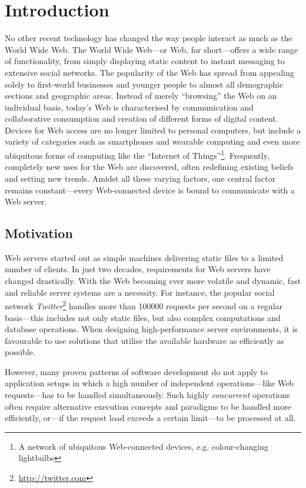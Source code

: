 \chapter{Introduction}
No other recent technology has changed the way people interact as much as the World Wide Web. The World Wide Web---or Web, for short---offers a wide range of functionality, from simply displaying static content to instant messaging to extensive social networks. The popularity of the Web has spread from appealing solely to first-world businesses and younger people to almost all demographic sections and geographic areas. Instead of merely ``browsing'' the Web on an individual basis, today's Web is characterised by communication and collaborative consumption and creation of different forms of digital content. Devices for Web access are no longer limited to personal computers, but include a variety of categories such as smartphones and wearable computing and even more ubiquitous forms of computing like the ``Internet of Things''\footnote{A network of ubiquitous Web-connected devices, e.g. colour-changing lightbulbs}. Frequently, completely new uses for the Web are discovered, often redefining existing beliefs and setting new trends. Amidst all these varying factors, one central factor remains constant---every Web-connected device is bound to communicate with a Web server.

\section{Motivation}
Web servers started out as simple machines delivering static files to a limited number of clients. In just two decades, requirements for Web servers have changed drastically. With the Web becoming ever more volatile and dynamic, fast and reliable server systems are a necessity. For instance, the popular social network \textit{Twitter}\footnote{\url{http://twitter.com}} handles more than 100000 requests per second on a regular basis---this includes not only static files, but also complex computations and database operations. When designing high-performance server environments, it is favourable to use solutions that utilise the available hardware as efficiently as possible.

However, many proven patterns of software development do not apply to application setups in which a high number of independent operations---like Web requests---has to be handled simultaneously. Such highly \textit{concurrent} operations often require alternative execution concepts and paradigms to be handled more efficiently, or---if the request load exceeds a certain limit---to be processed at all.

